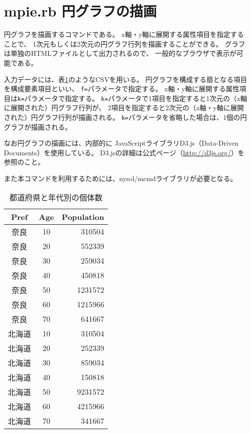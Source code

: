 


\section{mpie.rb 円グラフの描画\label{sect:mpie}}

円グラフを描画するコマンドである。
x軸・y軸に展開する属性項目を指定することで、
1次元もしくは2次元の円グラフ行列を描画することができる。
グラフは単独のHTMLファイルとして出力されるので、
一般的なブラウザで表示が可能である。

入力データには、表\ref{tbl:mpie_input2}のようなCSVを用いる。
円グラフを構成する扇となる項目を構成要素項目といい、
\verb|f=|パラメータで指定する。
x軸・y軸に展開する属性項目は\verb|k=|パラメータで指定する。
\verb|k=|パラメータで1項目を指定すると1次元の（x軸に展開された）円グラフ行列が、
2項目を指定すると2次元の（x軸・y軸に展開された）円グラフ行列が描画される。
\verb|k=|パラメータを省略した場合は、1個の円グラフが描画される。

なお円グラフの描画には、内部的に
JavaScriptライブラリD3.js（Data-Driven Documents）を使用している。
D3.jsの詳細は公式ページ（\url{http://d3js.org/}）を参照のこと。

また本コマンドを利用するためには、nysol/mcmdライブラリが必要となる。

\begin{table}[http]
\begin{center}
\caption{都道府県と年代別の個体数\label{tbl:mpie_input2}}
{\small
\begin{tabular}[t]{ccr}
\hline
Pref&Age&Population \\
\hline
奈良&10&310504\\
奈良&20&552339\\
奈良&30&259034\\
奈良&40&450818\\
奈良&50&1231572\\
奈良&60&1215966\\
奈良&70&641667\\
北海道&10&310504\\
北海道&20&252339\\
北海道&30&859034\\
北海道&40&150818\\
北海道&50&9231572\\
北海道&60&4215966\\
北海道&70&341667\\
\hline
\end{tabular}
}
\end{center}
\end{table}


